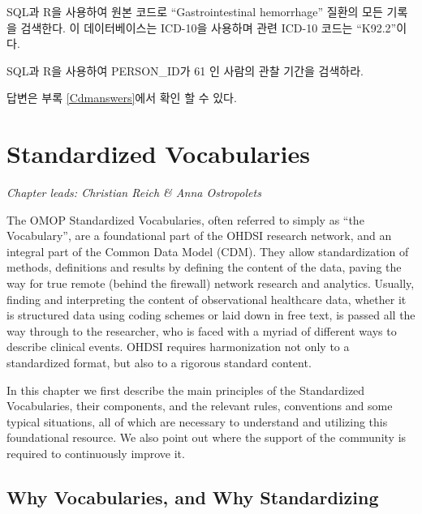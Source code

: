 \documentclass[11pt]{book}
\theoremstyle{definition}
\theoremstyle{definition}
\theoremstyle{definition}
\theoremstyle{remark}
\let\BeginKnitrBlock\begin \let\EndKnitrBlock\end
\begin{document}
\BeginKnitrBlock{exercise}
\protect\hypertarget{exr:exercisePersonSource}{}{\label{exr:exercisePersonSource}
}SQL과 R을 사용하여 원본 코드로 ``Gastrointestinal hemorrhage'' 질환의
모든 기록을 검색한다. 이 데이터베이스는 ICD-10을 사용하며 관련 ICD-10
코드는 ``K92.2''이다.
\EndKnitrBlock{exercise}

\BeginKnitrBlock{exercise}
\protect\hypertarget{exr:exercisePerson61Records}{}{\label{exr:exercisePerson61Records}
}SQL과 R을 사용하여 PERSON\_ID가 61 인 사람의 관찰 기간을 검색하라.
\EndKnitrBlock{exercise}

답변은 부록 \ref{Cdmanswers}에서 확인 할 수 있다.

\chapter{Standardized Vocabularies}\label{StandardizedVocabularies}


\emph{Chapter leads: Christian Reich \& Anna Ostropolets}

The OMOP Standardized Vocabularies, often referred to simply as ``the
Vocabulary'', are a foundational part of the OHDSI research network, and
an integral part of the Common Data Model (CDM). They allow
standardization of methods, definitions and results by defining the
content of the data, paving the way for true remote (behind the
firewall) network research and analytics. Usually, finding and
interpreting the content of observational healthcare data, whether it is
structured data using coding schemes or laid down in free text, is
passed all the way through to the researcher, who is faced with a myriad
of different ways to describe clinical events. OHDSI requires
harmonization not only to a standardized format, but also to a rigorous
standard content.

In this chapter we first describe the main principles of the
Standardized Vocabularies, their components, and the relevant rules,
conventions and some typical situations, all of which are necessary to
understand and utilizing this foundational resource. We also point out
where the support of the community is required to continuously improve
it.

\section{Why Vocabularies, and Why
Standardizing}\label{why-vocabularies-and-why-standardizing}
\end{document}
